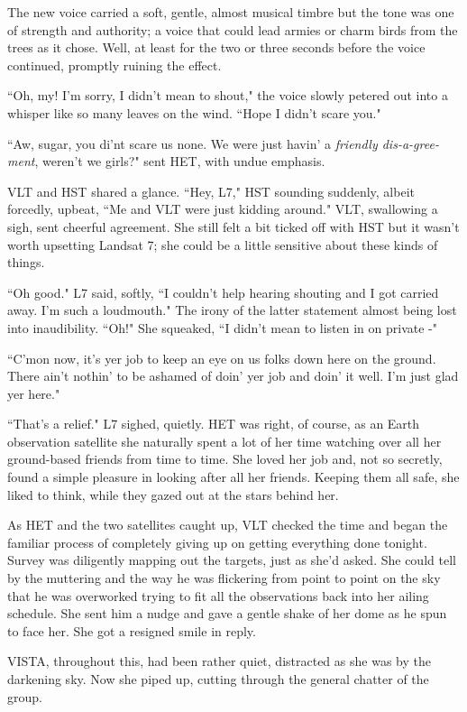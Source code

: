 \documentclass[12pt]{iopart}
\begin{document}
The new voice carried a soft, gentle, almost musical timbre but the tone was one of strength and authority; a voice that could lead armies or charm birds from the trees as it chose. Well, at least for the two or three seconds before the voice continued, promptly ruining the effect.

``Oh, my! I'm sorry, I didn't mean to shout," the voice slowly petered out into a whisper like so many leaves on the wind. ``Hope I didn't scare you."

``Aw, sugar, you di'nt scare us none. We were just havin' a \emph{friendly dis-a-gree-ment}, weren't we girls?" sent HET, with undue emphasis.

VLT and HST shared a glance. ``Hey, L7," HST sounding suddenly, albeit forcedly, upbeat, ``Me and VLT were just kidding around." VLT, swallowing a sigh, sent cheerful agreement. She still felt a bit ticked off with HST but it wasn't worth upsetting Landsat 7; she could be a little sensitive about these kinds of things.

``Oh good." L7 said, softly, ``I couldn't help hearing shouting and I got carried away. I'm such a loudmouth." The irony of the latter statement almost being lost into inaudibility. ``Oh!" She squeaked, ``I didn't mean to listen in on private -"

``C'mon now, it's yer job to keep an eye on us folks down here on the ground. There ain't nothin' to be ashamed of doin' yer job and doin' it well. I'm just glad yer here."

``That's a relief." L7 sighed, quietly. HET was right, of course, as an Earth observation satellite she naturally spent a lot of her time watching over all her ground-based friends from time to time. She loved her job and, not so secretly, found a simple pleasure in looking after all her friends. Keeping them all safe, she liked to think, while they gazed out at the stars behind her.

As HET and the two satellites caught up, VLT checked the time and began the familiar process of completely giving up on getting everything done tonight. Survey was diligently mapping out the targets, just as she'd asked. She could tell by the muttering and the way he was flickering from point to point on the sky that he was overworked trying to fit all the observations back into her ailing schedule. She sent him a nudge and gave a gentle shake of her dome as he spun to face her. She got a resigned smile in reply. 

VISTA, throughout this, had been rather quiet, distracted as she was by the darkening sky. Now she piped up, cutting through the general chatter of the group.
\end{document}
